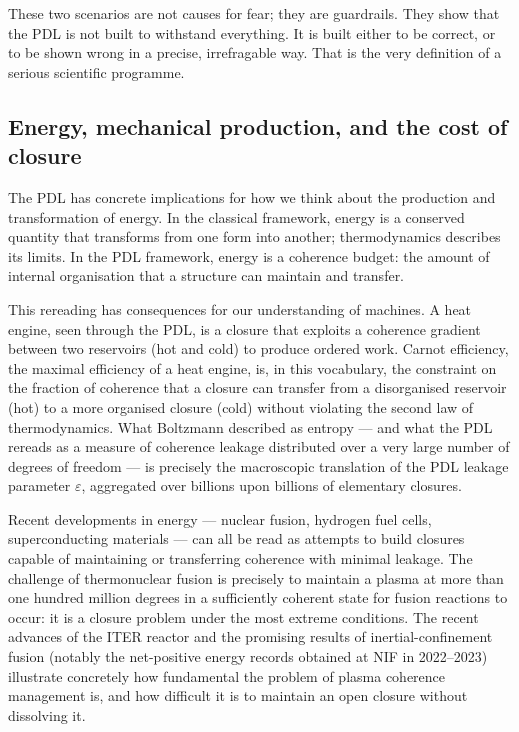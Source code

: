 \documentclass[11pt, a4paper, openright]{book}
\begin{document}
\medskip

These two scenarios are not causes for fear; they are guardrails. They show that the PDL is not built to withstand everything. It is built either to be correct, or to be shown wrong in a precise, irrefragable way. That is the very definition of a serious scientific programme.

\subsection*{Energy, mechanical production, and the cost of closure}

The PDL has concrete implications for how we think about the production and transformation of energy. In the classical framework, energy is a conserved quantity that transforms from one form into another; thermodynamics describes its limits. In the PDL framework, energy is a coherence budget: the amount of internal organisation that a structure can maintain and transfer.

\medskip

This rereading has consequences for our understanding of machines. A heat engine, seen through the PDL, is a closure that exploits a coherence gradient between two reservoirs (hot and cold) to produce ordered work. Carnot efficiency, the maximal efficiency of a heat engine, is, in this vocabulary, the constraint on the fraction of coherence that a closure can transfer from a disorganised reservoir (hot) to a more organised closure (cold) without violating the second law of thermodynamics. What Boltzmann described as entropy — and what the PDL rereads as a measure of coherence leakage distributed over a very large number of degrees of freedom — is precisely the macroscopic translation of the PDL leakage parameter $\varepsilon$, aggregated over billions upon billions of elementary closures.

\medskip

Recent developments in energy — nuclear fusion, hydrogen fuel cells, superconducting materials — can all be read as attempts to build closures capable of maintaining or transferring coherence with minimal leakage. The challenge of thermonuclear fusion is precisely to maintain a plasma at more than one hundred million degrees in a sufficiently coherent state for fusion reactions to occur: it is a closure problem under the most extreme conditions. The recent advances of the ITER reactor and the promising results of inertial-confinement fusion (notably the net-positive energy records obtained at NIF in 2022–2023) illustrate concretely how fundamental the problem of plasma coherence management is, and how difficult it is to maintain an open closure without dissolving it.
\end{document}
